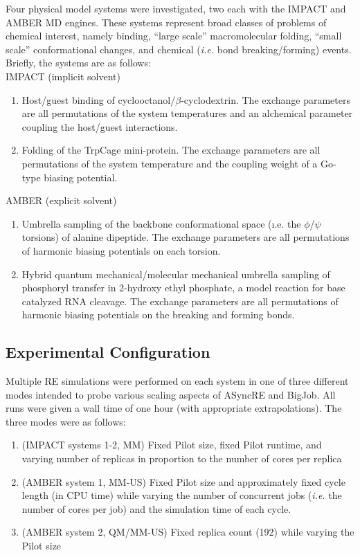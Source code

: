 \documentclass{sig-alternate}
\begin{document}
Four physical model systems were investigated, two each with the IMPACT and
AMBER MD engines. These systems represent broad classes of problems of chemical
interest, namely binding, ``large scale'' macromolecular folding, 
``small scale'' conformational changes, and chemical ({\em i.e.} bond 
breaking/forming) events. Briefly, the systems are as follows:\\
IMPACT (implicit solvent)
\begin{enumerate}
\item Host/guest binding of cyclooctanol/$\beta$-cyclodextrin. The exchange
  parameters are all permutations of the system temperatures and an
  alchemical parameter coupling the host/guest interactions.
\item Folding of the TrpCage mini-protein. The exchange parameters are all
  permutations of the system temperature and the coupling weight of a 
  Go-type biasing potential.
\end{enumerate} 
AMBER (explicit solvent)
\begin{enumerate}
\item Umbrella sampling of the backbone conformational space ({\i.e.} the 
  $\phi$/$\psi$ torsions) of alanine dipeptide. The exchange parameters are all
  permutations of harmonic biasing potentials on each torsion.
\item Hybrid quantum mechanical/molecular mechanical umbrella sampling of
  phosphoryl transfer in 2-hydroxy ethyl phosphate, a model reaction for base 
  catalyzed RNA cleavage. The exchange parameters are all permutations of 
  harmonic biasing potentials on the breaking and forming bonds.
\end{enumerate}

\subsection{Experimental Configuration}

Multiple RE simulations were performed on each system in one of three different
modes intended to probe various scaling aspects of ASyncRE and BigJob. All runs
were given a wall time of one hour (with appropriate extrapolations). The three
modes were as follows:
\begin{enumerate}[I]
\item (IMPACT systems 1-2, MM) Fixed Pilot size, fixed Pilot runtime, and varying number of replicas in proportion to the number of cores per replica
\item (AMBER system 1, MM-US) Fixed Pilot size and approximately fixed cycle
  length (in CPU time) while varying the number of concurrent jobs ({\em i.e.}
  the number of cores per job) and the simulation time of each cycle. 
\item (AMBER system 2, QM/MM-US) Fixed replica count (192) while varying the
  Pilot size %
\end{enumerate}
\end{document}
